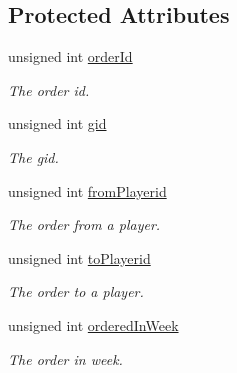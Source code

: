 \subsection*{Protected Attributes}
\begin{DoxyCompactItemize}
\item 
\mbox{\label{classPlayerEvent_abdd09cb025a56799d331736c94abcbad}} 
unsigned int \hyperlink{classPlayerEvent_abdd09cb025a56799d331736c94abcbad}{order\+Id}
\begin{DoxyCompactList}\small\item\em The order id. \end{DoxyCompactList}\item 
\mbox{\label{classPlayerEvent_a16c8dca1a40b4922a320829808fb9d13}} 
unsigned int \hyperlink{classPlayerEvent_a16c8dca1a40b4922a320829808fb9d13}{gid}
\begin{DoxyCompactList}\small\item\em The gid. \end{DoxyCompactList}\item 
\mbox{\label{classPlayerEvent_afdd7834bba00e55258afdfe0aa433efd}} 
unsigned int \hyperlink{classPlayerEvent_afdd7834bba00e55258afdfe0aa433efd}{from\+Playerid}
\begin{DoxyCompactList}\small\item\em The order from a player. \end{DoxyCompactList}\item 
\mbox{\label{classPlayerEvent_a596b915ab8a814b4afde7cbe90737719}} 
unsigned int \hyperlink{classPlayerEvent_a596b915ab8a814b4afde7cbe90737719}{to\+Playerid}
\begin{DoxyCompactList}\small\item\em The order to a player. \end{DoxyCompactList}\item 
\mbox{\label{classPlayerEvent_ad5460958dd5953366aa7f72d3e09f6c1}} 
unsigned int \hyperlink{classPlayerEvent_ad5460958dd5953366aa7f72d3e09f6c1}{ordered\+In\+Week}
\begin{DoxyCompactList}\small\item\em The order in week. \end{DoxyCompactList}\item 

\end{DoxyCompactItemize}
